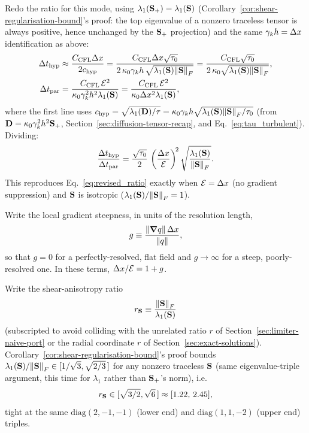 Redo the ratio for this mode,
using $\lambda_1(\mathbf{S}_{+})=\lambda_1(\mathbf{S})$ (Corollary~\ref{cor:shear-regularisation-bound}'s
proof: the top eigenvalue of a nonzero traceless tensor is always
positive, hence unchanged by the $\mathbf{S}_{+}$ projection) and the same
$\gamma_{k} h=\Delta x$ identification as above:
\begin{align}
  \Delta t_{\rm hyp} &\approx \frac{C_{\mathrm{CFL}}\Delta x}{2c_{\rm hyp}}
  = \frac{C_{\mathrm{CFL}}\Delta x\sqrt{\tau_0}}{2\,\kappa_{0}\gamma_{k} h\,\sqrt{\lambda_1(\mathbf{S})\norm{\mathbf{S}}_F}}
  = \frac{C_{\mathrm{CFL}}\sqrt{\tau_0}}{2\,\kappa_{0}\sqrt{\lambda_1(\mathbf{S})\norm{\mathbf{S}}_F}} , \\
  \Delta t_{\rm par} &= \frac{C_{\mathrm{CFL}}\,\mathcal{E}^2}{\kappa_{0}\gamma_{k}^2h^2\lambda_1(\mathbf{S})}
  = \frac{C_{\mathrm{CFL}}\,\mathcal{E}^2}{\kappa_{0}\Delta x^2\lambda_1(\mathbf{S})} ,
\end{align}
where the first line uses
$c_{\rm hyp}=\sqrt{\lambda_1(\mathbf{D})/\tau}=\kappa_{0}\gamma_{k} h\sqrt{\lambda_1(\mathbf{S})\norm{\mathbf{S}}_F/\tau_0}$
(from $\mathbf{D}=\kappa_{0}\gamma_{k}^2h^2\mathbf{S}_{+}$,
Section~\ref{sec:diffusion-tensor-recap}, and
Eq.~\eqref{eq:tau_turbulent}). Dividing:
\begin{equation}
  \label{eq:aniso_ratio}
  \frac{\Delta t_{\rm hyp}}{\Delta t_{\rm par}}
  = \frac{\sqrt{\tau_0}}{2}\,\left(\frac{\Delta x}{\mathcal{E}}\right)^{\!2}
  \sqrt{\frac{\lambda_1(\mathbf{S})}{\norm{\mathbf{S}}_F}} .
\end{equation}
This reproduces Eq.~\eqref{eq:revised_ratio} exactly when
$\mathcal{E}=\Delta x$ (no gradient suppression) and $\mathbf{S}$ is isotropic
($\lambda_1(\mathbf{S})/\norm{\mathbf{S}}_F=1$).

Write the local gradient steepness, in units of the resolution length,
\begin{equation}
  g \equiv \frac{\norm{\grad q}\,\Delta x}{\norm{q}} ,
\end{equation}
so that $g=0$ for a perfectly-resolved, flat field and $g\to\infty$ for a
steep, poorly-resolved one. In these terms, $\Delta x/\mathcal{E}=1+g$.

Write the shear-anisotropy ratio
\begin{equation}
  r_{\mathbf{S}} \equiv \frac{\norm{\mathbf{S}}_F}{\lambda_1(\mathbf{S})}
\end{equation}
(subscripted to avoid colliding with the unrelated ratio $r$ of
Section~\ref{sec:limiter-naive-port} or the radial coordinate $r$ of
Section~\ref{sec:exact-solutions}). Corollary~\ref{cor:shear-regularisation-bound}'s
proof bounds $\lambda_1(\mathbf{S})/\norm{\mathbf{S}}_F\in[1/\sqrt3,\sqrt{2/3}\,]$
for any nonzero traceless $\mathbf{S}$ (same eigenvalue-triple argument, this
time for $\lambda_1$ rather than $\mathbf{S}_{+}$'s norm), i.e.
\begin{equation}
  r_{\mathbf{S}} \in [\sqrt{3/2},\sqrt6\,] \approx [1.22,\,2.45] ,
\end{equation}
tight at the same $\mathrm{diag}(2,-1,-1)$ (lower end) and
$\mathrm{diag}(1,1,-2)$ (upper end) triples.

